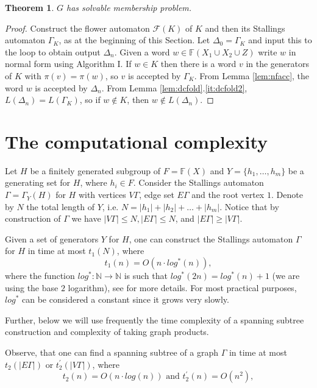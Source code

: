 \documentclass[a4paper,12pt]{article}
\newcommand{\G}{\Gamma }
\newcommand{\D}{\Delta }
\newcommand{\cF}{{\cal{F}}}
\newtheorem{theorem}{Theorem}[section]
\numberwithin{equation}{section}
\numberwithin{figure}{section}
\newcommand{\NN}{\ensuremath{\mathbb{N}}}
\newcommand{\FF}{\ensuremath{\mathbb{F}}}
\renewcommand{\cF}{\mathcal{F}}
\begin{document}
\begin{theorem}
$G$ has solvable membership problem.
\end{theorem}
\begin{proof}
Construct the flower automaton $\cF(K)$ of $K$ and then
its Stallings automaton $\G_K$,  as at the beginning of this Section. %
Let $\D_0=\G_K$ and input this to the loop to obtain output $\D_n$.
Given a word $w\in \FF(X_1\cup X_2\cup Z)$ write $w$ in normal form
using Algorithm I. If $w\in K$ then there is a word $v$ in the generators
 of $K$ with $\pi(v)=\pi(w)$, so $v$ is accepted by $\G_K$. From
Lemma \ref{lem:nfacc}, the word $w$ is accepted by $\D_n$. From
Lemma \ref{lem:dcfold}.\ref{it:dcfold2}, $L(\D_n)=L(\G_K)$,
so if $w\notin K$, then
$w\notin L(\D_n)$.
\end{proof}

\section{The computational complexity}\label{sec:TC}

{}


Let $H$ be a finitely generated subgroup of $F=\FF(X)$ and
$Y=\{h_1,\ldots ,h_m\}$ be a generating set for $H$, where $h_i\in
F$. Consider the Stallings automaton $\G = \G_Y(H)$ for $H$ with
vertices $V\G$, edge set $E\G$ and the root vertex $1$. Denote by
$N$ the total length of $Y$, i.e. $N = |h_1| + |h_2| + \ldots +
|h_m|$. Notice that by construction of $\G$ we have $|V\G| \le N,
|E\G| \le N$, and $|E \G| \ge |V \G|$.

Given a set of generators $Y$ for $H$, one can construct the
Stallings automaton $\G$ for $H$ in time at most $t_1(N)$, where
\begin{equation}\label{t1} t_1(n) = O (n \cdot log^{\ast}(n)),
\end{equation}
where the function $log^{\ast}: \NN \rightarrow \NN$ is such that
$log^{\ast}(2n) = log^{\ast}(n) + 1$ (we are using the base $2$
logarithm), see \cite{touikan} for more details. For most
practical purposes, $log^{\ast}$ can be considered a constant
since it grows very slowly.

Further, below we will use frequently the time complexity of a
spanning subtree construction and complexity of taking graph
products.

Observe, that one can find a spanning subtree of a graph $\G$ in
time at most $t_2(|E\G|)$ or $t^{\prime}_2(|V\G|)$, where
\begin{equation}\label{t2}
t_2(n) = O(n \cdot log(n)) {\textrm{ and }} t^{\prime}_2(n) =
O(n^2),
\end{equation}
\end{document}
